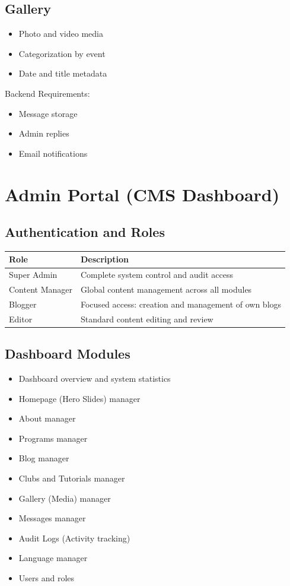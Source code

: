 \documentclass[12pt,a4paper]{article}
\begin{document}
\subsection{Gallery}
\begin{itemize}
    \item Photo and video media
    \item Categorization by event
    \item Date and title metadata
\end{itemize}

Backend Requirements:
\begin{itemize}
    \item Message storage
    \item Admin replies
    \item Email notifications
\end{itemize}

\section{Admin Portal (CMS Dashboard)}

\subsection{Authentication and Roles}

\begin{center}
\begin{tabular}{ll}
\toprule
Role & Description \\
\midrule
Super Admin & Complete system control and audit access \\
Content Manager & Global content management across all modules \\
Blogger & Focused access: creation and management of own blogs \\
Editor & Standard content editing and review \\
\bottomrule
\end{tabular}
\end{center}

\subsection{Dashboard Modules}
\begin{itemize}
    \item Dashboard overview and system statistics
    \item Homepage (Hero Slides) manager
    \item About manager
    \item Programs manager
    \item Blog manager
    \item Clubs and Tutorials manager
    \item Gallery (Media) manager
    \item Messages manager
    \item Audit Logs (Activity tracking)
    \item Language manager
    \item Users and roles
\end{itemize}
\end{document}
